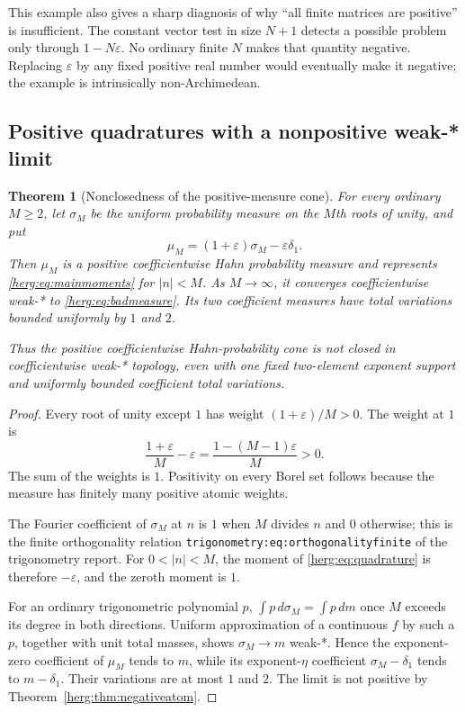 \documentclass[11pt,letterpaper]{article}
\newtheorem{theorem}{Theorem}[section]
\theoremstyle{definition}
\newcommand{\eps}{\varepsilon}
\newcommand{\dd}{\,d}
\newcommand{\lbl}[1]{\nolinkurl{#1}}%
\numberwithin{equation}{section}
\begin{document}
This example also gives a sharp diagnosis of why ``all finite matrices are positive'' is insufficient. The constant vector test in size $N+1$ detects a possible problem only through $1-N\eps$. No ordinary finite $N$ makes that quantity negative. Replacing $\eps$ by any fixed positive real number would eventually make it negative; the example is intrinsically non-Archimedean.

\subsection{Positive quadratures with a nonpositive weak-* limit}

\begin{theorem}[Nonclosedness of the positive-measure cone]\label{herg:thm:quadrature}
For every ordinary $M\ge2$, let $\sigma_M$ be the uniform probability measure on the $M$th roots of unity, and put
\begin{equation}\label{herg:eq:quadrature}
 \mu_M=(1+\eps)\sigma_M-\eps\delta_1.
\end{equation}
Then $\mu_M$ is a positive coefficientwise Hahn probability measure and represents \eqref{herg:eq:mainmoments} for $|n|<M$. As $M\to\infty$, it converges coefficientwise weak-* to \eqref{herg:eq:badmeasure}. Its two coefficient measures have total variations bounded uniformly by $1$ and $2$.

Thus the positive coefficientwise Hahn-probability cone is not closed in coefficientwise weak-* topology, even with one fixed two-element exponent support and uniformly bounded coefficient total variations.
\end{theorem}
\begin{proof}
Every root of unity except $1$ has weight $(1+\eps)/M>0$. The weight at $1$ is
\[
 \frac{1+\eps}{M}-\eps
 =\frac{1-(M-1)\eps}{M}>0.
\]
The sum of the weights is $1$. Positivity on every Borel set follows because the measure has finitely many positive atomic weights.

The Fourier coefficient of $\sigma_M$ at $n$ is $1$ when $M$ divides $n$ and $0$ otherwise; this is the finite orthogonality relation \lbl{trigonometry:eq:orthogonalityfinite} of the trigonometry report. For $0<|n|<M$, the moment of \eqref{herg:eq:quadrature} is therefore $-\eps$, and the zeroth moment is $1$.

For an ordinary trigonometric polynomial $p$, $\int p\dd\sigma_M=\int p\dd m$ once $M$ exceeds its degree in both directions. Uniform approximation of a continuous $f$ by such a $p$, together with unit total masses, shows $\sigma_M\to m$ weak-*. Hence the exponent-zero coefficient of $\mu_M$ tends to $m$, while its exponent-$\eta$ coefficient $\sigma_M-\delta_1$ tends to $m-\delta_1$. Their variations are at most $1$ and $2$. The limit is not positive by Theorem~\ref{herg:thm:negativeatom}.
\end{proof}
\end{document}
